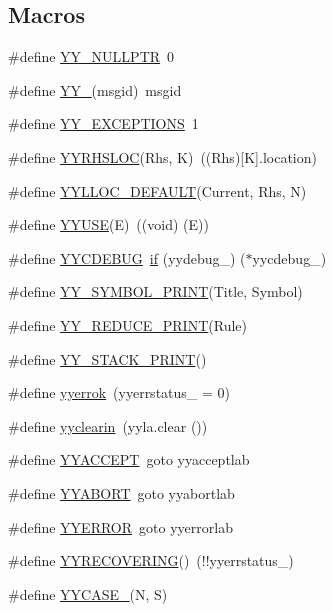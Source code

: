 \subsection*{Macros}
\begin{DoxyCompactItemize}
\item 
\#define \hyperlink{_genesys_09_09-parser_8cpp_a5a6c82f7ce4ad9cc8c6c08b7a2de5b84}{Y\-Y\-\_\-\-N\-U\-L\-L\-P\-T\-R}~0
\item 
\#define \hyperlink{_genesys_09_09-parser_8cpp_a86f079016f11f0600f4259f3f03f8d43}{Y\-Y\-\_\-}(msgid)~msgid
\item 
\#define \hyperlink{_genesys_09_09-parser_8cpp_a50c42b07435bf2867d707c84388133bf}{Y\-Y\-\_\-\-E\-X\-C\-E\-P\-T\-I\-O\-N\-S}~1
\item 
\#define \hyperlink{_genesys_09_09-parser_8cpp_ab2b4f027a2b092ac14ca4464e7b3db60}{Y\-Y\-R\-H\-S\-L\-O\-C}(Rhs, K)~((Rhs)\mbox{[}K\mbox{]}.location)
\item 
\#define \hyperlink{_genesys_09_09-parser_8cpp_a485d38f93de30679900c9cad6e7f3446}{Y\-Y\-L\-L\-O\-C\-\_\-\-D\-E\-F\-A\-U\-L\-T}(Current, Rhs, N)
\item 
\#define \hyperlink{_genesys_09_09-parser_8cpp_a33c61e326f5675cc74eb9e1a6906595c}{Y\-Y\-U\-S\-E}(E)~((void) (E))
\item 
\#define \hyperlink{_genesys_09_09-parser_8cpp_a3649de2ba01c20b4c9ec72bdc71b2956}{Y\-Y\-C\-D\-E\-B\-U\-G}~\hyperlink{_genesys_09_09-scanner_8cpp_ad4a65b873df5c05570846b5413b41dfd}{if} (yydebug\-\_\-) ($\ast$yycdebug\-\_\-)
\item 
\#define \hyperlink{_genesys_09_09-parser_8cpp_a4b71a422d1f0f6b0f93e6cfbe988d9ed}{Y\-Y\-\_\-\-S\-Y\-M\-B\-O\-L\-\_\-\-P\-R\-I\-N\-T}(Title, Symbol)
\item 
\#define \hyperlink{_genesys_09_09-parser_8cpp_a49ad456240785266cadae498ddae9310}{Y\-Y\-\_\-\-R\-E\-D\-U\-C\-E\-\_\-\-P\-R\-I\-N\-T}(Rule)
\item 
\#define \hyperlink{_genesys_09_09-parser_8cpp_a56e528a4079b5c725f0fcbe184414bf5}{Y\-Y\-\_\-\-S\-T\-A\-C\-K\-\_\-\-P\-R\-I\-N\-T}()
\item 
\#define \hyperlink{_genesys_09_09-parser_8cpp_a20bf055e53dc4fd5afddfd752a4d1adb}{yyerrok}~(yyerrstatus\-\_\- = 0)
\item 
\#define \hyperlink{_genesys_09_09-parser_8cpp_a5035d59933b3f5388c44f596145db047}{yyclearin}~(yyla.\-clear ())
\item 
\#define \hyperlink{_genesys_09_09-parser_8cpp_aa6c7a65b580c214b2ea832fd7bdd472e}{Y\-Y\-A\-C\-C\-E\-P\-T}~goto yyacceptlab
\item 
\#define \hyperlink{_genesys_09_09-parser_8cpp_a3bcde0b05b9aa4ec5169092d9d211dbd}{Y\-Y\-A\-B\-O\-R\-T}~goto yyabortlab
\item 
\#define \hyperlink{_genesys_09_09-parser_8cpp_af1eef6197be78122699013d0784acc80}{Y\-Y\-E\-R\-R\-O\-R}~goto yyerrorlab
\item 
\#define \hyperlink{_genesys_09_09-parser_8cpp_ad860e18ca4b79fc589895b531bdb7948}{Y\-Y\-R\-E\-C\-O\-V\-E\-R\-I\-N\-G}()~(!!yyerrstatus\-\_\-)
\item 
\#define \hyperlink{_genesys_09_09-parser_8cpp_a5678224066e7b61a101000279b4bb0be}{Y\-Y\-C\-A\-S\-E\-\_\-}(N, S)
\end{DoxyCompactItemize}



